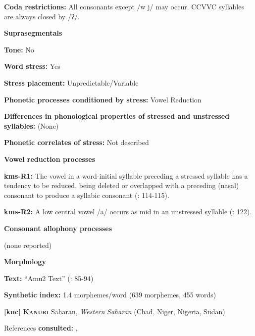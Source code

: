\textbf{Coda restrictions:} All consonants except /w j/ may occur. CCVVC syllables are always closed by /ʔ/.



\textbf{Suprasegmentals}



\textbf{Tone:} No



\textbf{Word stress:} Yes



\textbf{Stress placement:} Unpredictable/Variable



\textbf{Phonetic processes conditioned by stress:} Vowel Reduction



\textbf{Differences in phonological properties of stressed and unstressed syllables:} (None)



\textbf{Phonetic correlates of stress:} Not described



\textbf{Vowel reduction processes}



\textbf{kms-R1:} The vowel in a word-initial syllable preceding a stressed syllable has a tendency to be reduced, being deleted or overlapped with a preceding (nasal) consonant to produce a syllabic consonant (\citealt{SandersSanders1980}: 114-115).



\textbf{kms-R2:} A low central vowel /a/ occurs as mid in an unstressed syllable (\citealt{SandersSanders1980}: 122).



\textbf{Consonant allophony processes}



(none reported)



\textbf{Morphology}



\textbf{Text:} “Amu2 Text” (\citealt{SandersSanders1994}: 85-94)



\textbf{Synthetic index:} 1.4 morphemes/word (639 morphemes, 455 words)



\textbf{[knc]}   \textbf{\textsc{Kanuri}}    Saharan, \textit{Western} \textit{Saharan} (Chad, Niger, Nigeria, Sudan)



References \textbf{consulted:} \citet{Cyffer1998}, \citet{Hutchison1981}



